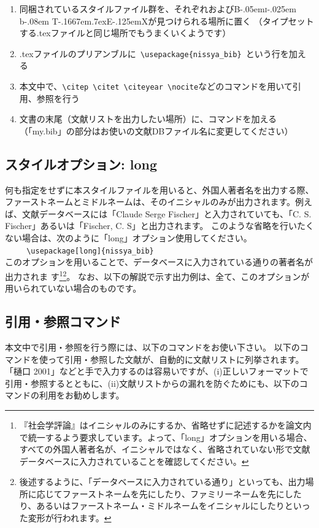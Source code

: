 \documentclass[article, 11pt]{jlreq}
\def\BibTeX{{\textrm{B}\kern-.05em{\textsc{i}\kern-.025em b}\kern-.08em
    T\kern-.1667em\lower.7ex\hbox{E}\kern-.125emX}}
\begin{document}
\begin{enumerate}
\item 同梱されているスタイルファイル群を、それぞれ\LaTeXe および\BibTeX が見つけられる場所に置く （タイプセットする.texファイルと同じ場所でもうまくいくようです）
\item .texファイルのプリアンブルに\verb| \usepackage{nissya_bib} |という行を加える
\item 本文中で、\verb|\citep \citet \citeyear \nocite|などのコマンドを用いて引用、参照を行う
\item 文書の末尾（文献リストを出力したい場所）に、\verb||コマンドを加える （「my.bib」の部分はお使いの文献DBファイル名に変更してください）
\end{enumerate}

\subsection{スタイルオプション: long}

何も指定をせずに本スタイルファイルを用いると、外国人著者名を出力する際、ファーストネームとミドルネームは、そのイニシャルのみが出力されます。例えば、文献データベースには「Claude Serge Fischer」と入力されていても、「C. S. Fischer」あるいは「Fischer, C. S」と出力されます。
このような省略を行いたくない場合は、次のように「long」オプション使用してください。\\
　　\verb| \usepackage[long]{nissya_bib} |\\
このオプションを用いることで、データベースに入力されている通りの著者名が出力されま
す\footnote{『社会学評論』はイニシャルのみにするか、省略せずに記述するかを論文内で統一するよう要求しています。よって、「long」オプションを用いる場合、すべての外国人著者名が、イニシャルではなく、省略されていない形で文献データベースに入力されていることを確認してください。}\footnote{後述するように、「データベースに入力されている通り」といっても、出力場所に応じてファーストネームを先にしたり、ファミリーネームを先にしたり、あるいはファーストネーム・ミドルネームをイニシャルにしたりといった変形が行われます。}。
なお、以下の解説で示す出力例は、全て、このオプションが用いられていない場合のものです。

\subsection{引用・参照コマンド}

本文中で引用・参照を行う際には、以下のコマンドをお使い下さい。
以下のコマンドを使って引用・参照した文献が、自動的に文献リストに列挙されます。
「樋口 2001」などと手で入力するのは容易いですが、(i)正しいフォーマットで引用・参照するとともに、(ii)文献リストからの漏れを防ぐためにも、以下のコマンドの利用をお勧めします。
\end{document}
